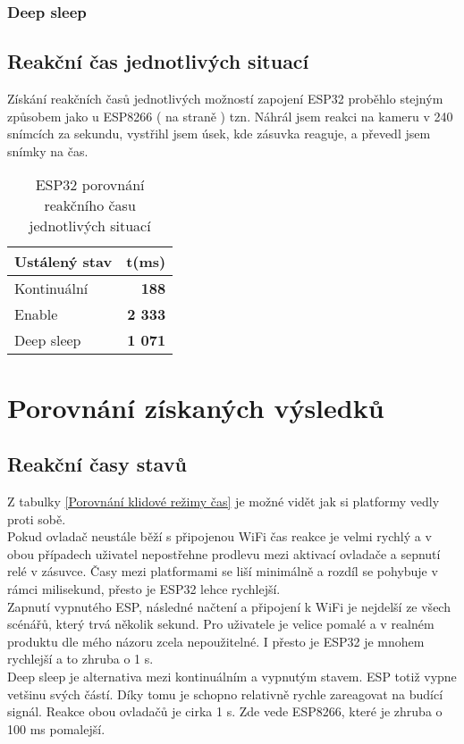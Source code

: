 \documentclass[a4paper, 12pt]{report}
\begin{document}
				\subsubsection{Deep sleep}

			\subsection{Reakční čas jednotlivých situací}
				Získání reakčních časů jednotlivých možností zapojení ESP32 proběhlo stejným způsobem jako u ESP8266 ( na straně \pageref{sonyvegaspostup}) tzn. Náhrál jsem reakci na kameru v 240 snímcích za sekundu, vystřihl jsem úsek, kde zásuvka reaguje, a převedl jsem snímky na čas.

				\begin{table}[h]
					\centering
					\caption{ESP32 porovnání reakčního času jednotlivých situací}
					\begin{tabular}{||l|r||}
						\hline
						Ustálený stav & t(ms) \\
						\hline
						Kontinuální & {\bf 188} \\
						Enable & {\bf 2 333} \\
						Deep sleep & {\bf 1 071} \\
						\hline
					\end{tabular}
					\label{ESP32 klidové režimy čas}
				\end{table}

		\section{Porovnání získaných výsledků}
			\subsection{Reakční časy stavů}
			Z tabulky \ref{Porovnání klidové režimy čas} je možné vidět jak si platformy vedly proti sobě. \\
			Pokud ovladač neustále běží s připojenou WiFi čas reakce je velmi rychlý a v obou případech uživatel nepostřehne prodlevu mezi aktivací ovladače a sepnutí relé v zásuvce. Časy mezi platformami se liší minimálně a rozdíl se pohybuje v rámci milisekund, přesto je ESP32 lehce rychlejší. \\
			Zapnutí vypnutého ESP, následné načtení a připojení k WiFi je nejdelší ze všech scénářů, který trvá několik sekund. Pro uživatele je velice pomalé a v realném produktu dle mého názoru zcela nepoužitelné. I přesto je ESP32 je mnohem rychlejší a to zhruba o 1 \si{s}. \\
			Deep sleep je alternativa mezi kontinuálním a vypnutým stavem. ESP totiž vypne vetšinu svých částí. Díky tomu je schopno relativně rychle zareagovat na budící signál. Reakce obou ovladačů je cirka 1 \si{s}. Zde vede ESP8266, které je zhruba o 100 \si{ms} pomalejší.
\end{document}
